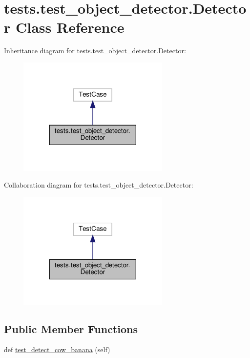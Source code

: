 \hypertarget{classtests_1_1test__object__detector_1_1Detector}{}\section{tests.\+test\+\_\+object\+\_\+detector.\+Detector Class Reference}
\label{classtests_1_1test__object__detector_1_1Detector}


Inheritance diagram for tests.\+test\+\_\+object\+\_\+detector.\+Detector\+:
\nopagebreak
\begin{figure}[H]
\begin{center}
\leavevmode
\includegraphics[width=213pt]{classtests_1_1test__object__detector_1_1Detector__inherit__graph}
\end{center}
\end{figure}


Collaboration diagram for tests.\+test\+\_\+object\+\_\+detector.\+Detector\+:
\nopagebreak
\begin{figure}[H]
\begin{center}
\leavevmode
\includegraphics[width=213pt]{classtests_1_1test__object__detector_1_1Detector__coll__graph}
\end{center}
\end{figure}
\subsection*{Public Member Functions}
\begin{DoxyCompactItemize}
\item 
def \hyperlink{classtests_1_1test__object__detector_1_1Detector_afa15ba2941421016d69736377f867233}{test\+\_\+detect\+\_\+cow\+\_\+banana} (self)
\end{DoxyCompactItemize}


